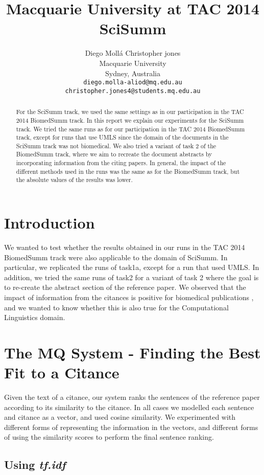 \documentclass[11pt]{article}
\title{Macquarie University at TAC 2014 SciSumm}
\author{Diego Moll\'a \hfill Christopher jones\\
  Macquarie University\\
  Sydney, Australia\\
  {\tt diego.molla-aliod@mq.edu.au}\\
  {\tt christopher.jones4@students.mq.edu.au}}
\date{}
\begin{document}
\maketitle
\begin{abstract}
  For the SciSumm track, we used the same settings as in our
  participation in the TAC 2014 BiomedSumm track. In this report we
  explain our experiments for the SciSumm track. We tried the same
  runs as for our participation in the TAC 2014 BiomedSumm track,
  except for runs that use UMLS since the domain of the documents in
  the SciSumm track was not biomedical. We also tried a variant of
  task 2 of the BiomedSumm track, where we aim to recreate the
  document abstracts by incorporating information from the citing
  papers. In general, the impact of the different methods used in the
  runs was the same as for the BiomedSumm track, but the absolute
  values of the results was lower.
\end{abstract}

\section{Introduction}

We wanted to test whether the results obtained in our runs in the TAC
2014 BiomedSumm track were also applicable to the domain of
SciSumm. In particular, we replicated the runs of task1a, except for a
run that used UMLS. In addition, we tried the same runs of task2 for a
variant of task 2 where the goal is to re-create the abstract section
of the reference paper. We observed that the impact of information
from the citances is positive for biomedical publications
\cite{Molla:ALTA2014}, and we wanted to know whether this is also true
for the Computational Linguistics domain.

\section{The MQ System - Finding the Best Fit to a Citance}

Given the text of a citance, our system ranks the sentences of the
reference paper according to its similarity to the citance. In all
cases we modelled each sentence and citance as a vector, and used
cosine similarity. We experimented with different forms of
representing the information in the vectors, and different forms of
using the similarity scores to perform the final sentence ranking.

\subsection{Using \emph{tf.idf}}\label{sec:tfidf}
\end{document}
